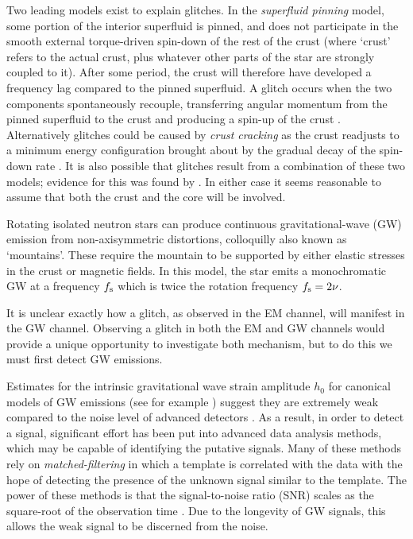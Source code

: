 \documentclass[../full_thesis/full_thesis.tex]{subfiles}
\begin{document}
Two leading models exist to explain glitches. In the \emph{superfluid pinning}
model, some portion of the interior superfluid is pinned, and does not
participate in the smooth external torque-driven spin-down of the rest of the
crust (where `crust' refers to the actual crust, plus whatever other parts of
the star are strongly coupled to it).  After some period, the crust will
therefore have developed a frequency lag compared to the pinned superfluid. A
glitch occurs when the two components spontaneously recouple, transferring
angular momentum from the pinned superfluid to the crust and producing a
spin-up of the crust \citep{Anderson1975, Alpar1984}.  Alternatively glitches
could be caused by \emph{crust cracking} as the crust readjusts to a minimum
energy configuration brought about by the gradual decay of the spin-down rate
\citep{Baym1971}.  It is also possible that glitches result from a combination
of these two models; evidence for this was found by \citet{Melatos2008}.  In
either case it seems reasonable to assume that both the crust and the core will
be involved.

Rotating isolated neutron stars can produce continuous gravitational-wave (GW)
emission from non-axisymmetric distortions, colloquilly also known as `mountains'. These
require the mountain to be supported by either elastic stresses in the crust or
magnetic fields. In this model, the star emits a monochromatic GW at a
frequency $f_{\textrm{s}}$ which is twice the rotation frequency $f_{\textrm{s}}=2\nu$.

It is unclear exactly how a glitch, as observed in the EM channel, will
manifest in the GW channel.  Observing a glitch in both the EM and GW channels
would provide a unique opportunity to investigate both mechanism, but to do
this we must first detect GW emissions.

Estimates for the intrinsic gravitational wave strain amplitude
$h_0$ for canonical models of GW emissions (see for example \citet{ligo2008})
suggest they are extremely weak compared to the noise level of advanced
detectors \citep{ligo2015}.  As a result, in order to detect a signal,
significant effort has been put into advanced data analysis methods,
which may be capable of identifying the putative signals. Many of these methods
rely on \emph{matched-filtering} in which a template is correlated with the data
with the hope of detecting the presence of the unknown signal similar to the
template. The power of these methods is that
the signal-to-noise ratio (SNR) scales as the square-root of the observation
time \citep{Prix2009}. Due to the longevity of GW signals, this allows the weak
signal to be discerned from the noise.
\end{document}
